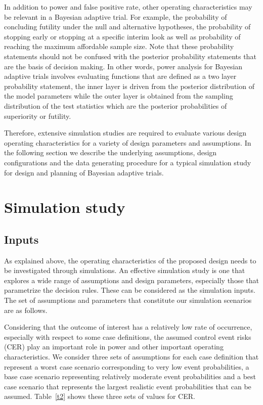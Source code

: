 \documentclass[12pt]{article}
\begin{document}
In addition to power and false positive rate, other operating characteristics may be relevant in a Bayesian adaptive trial. For example, the probability of concluding futility under the null and alternative hypotheses, the probability of stopping early or stopping at a specific interim look as well as probability of reaching the maximum affordable sample size. Note that these probability statements should not be confused with the posterior probability statements that are the basis of decision making. In other words, power analysis for Bayesian adaptive trials involves evaluating functions that are defined as a two layer probability statement, the inner layer is driven from the posterior distribution of the model parameters while the outer layer is obtained from the sampling distribution of the test statistics which are the posterior probabilities of superiority or futility. 

Therefore, extensive simulation studies are required to evaluate various design operating characteristics for a variety of design parameters and assumptions. In the following section we describe the underlying assumptions, design configurations and the data generating procedure for a typical simulation study for design and planning of Bayesian adaptive trials.


\section{Simulation study}\label{Sec:sims}

\subsection{Inputs}

As explained above, the operating characteristics of the proposed design needs to be investigated through simulations. An effective simulation study is one that explores a wide range of assumptions and design parameters, especially those that parametrize the decision rules. These can be considered as the simulation inputs. The set of assumptions and parameters that constitute our simulation scenarios are as follows.

Considering that the outcome of interest has a relatively low rate of occurrence, especially with respect to some case definitions, the assumed control event risks (CER) play an important role in power and other important operating characteristics. We consider three sets of assumptions for each case definition that represent a worst case scenario corresponding to very low event probabilities, a base case scenario representing relatively moderate event probabilities and a best case scenario that represents the largest realistic event probabilities that can be assumed. Table~\ref{t2} shows these three sets of values for CER.
\end{document}

